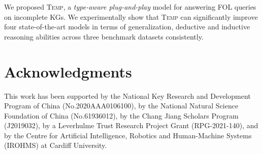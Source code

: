 We proposed \textsc{Temp}, a \emph{type-aware plug-and-play} model for  answering FOL queries on incomplete  KGs. %
We experimentally show that \textsc{Temp}  can significantly improve four state-of-the-art models in terms of generalization, deductive and inductive reasoning abilities across three benchmark datasets consistently. 



\clearpage
\section*{Acknowledgments}
This work has been supported by the National Key Research and Development Program of China (No.2020AAA0106100), by the National Natural Science Foundation of China (No.61936012), by the Chang Jiang Scholars Program (J2019032), by a  Leverhulme Trust Research Project Grant (RPG-2021-140), and by the Centre for Artificial Intelligence, Robotics and Human-Machine Systems (IROHMS) at Cardiff University.

